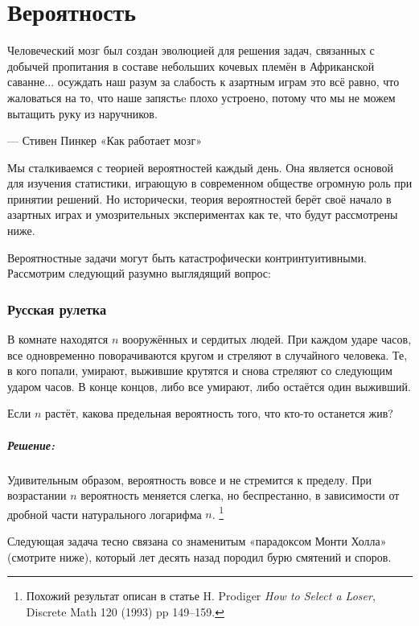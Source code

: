 ﻿%
\chapter*{Вероятность}

\setlength{\epigraphwidth}{.85\textwidth}
\epigraph{Человеческий мозг был создан эволюцией для решения задач, связанных с добычей пропитания в составе небольших кочевых племён в Африканской саванне...
осуждать наш разум за слабость к азартным играм это всё равно, что жаловаться на то, что наше запястьe плохо устроено, потому что мы не можем вытащить руку из наручников.}{--- Стивен Пинкер «Как работает мозг»%
}

Мы сталкиваемся с теорией вероятностей каждый день.
Она является основой для изучения статистики, играющую в современном обществе огромную роль при принятии решений.
Но исторически, теория вероятностей берёт своё начало в азартных играх и умозрительных экспериментах как те, что будут рассмотрены ниже.

\medskip

Вероятностные задачи могут быть катастрофически контринтуитивными.
Рассмотрим следующий разумно выглядящий вопрос:

\subsection*{Русская рулетка} %

В комнате находятся $n$ вооружённых и сердитых людей.
При каждом ударе часов, все одновременно поворачиваются кругом и стреляют в случайного человека.
Те, в кого попали, умирают, выжившие крутятся и снова стреляют со следующим ударом часов.
В конце концов, либо все умирают, либо остаётся один выживший.

Если $n$ растёт, какова предельная вероятность того, что кто-то останется жив?

\paragraph{Решение:} Удивительным образом, вероятность вовсе и не стремится к пределу.
При возрастании $n$ вероятность меняется слегка, но беспрестанно, в зависимости от дробной части натурального логарифма $n$.%
\footnote{Похожий результат описан в статье H. Prodiger \emph{How to Select a Loser}, Discrete Math 120 (1993) pp 149--159.}

\medskip

Следующая задача тесно связана со знаменитым «парадоксом Монти Холла» (смотрите ниже), который лет десять назад породил бурю смятений и споров.

